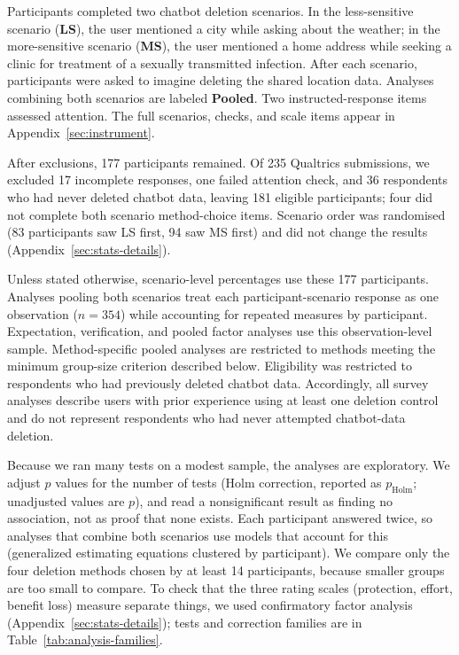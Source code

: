 \documentclass[conference,compsoc]{IEEEtran}
\begin{document}
Participants completed two chatbot deletion scenarios. In the less-sensitive scenario (\textbf{LS}), the user mentioned a city while asking about the weather; in the more-sensitive scenario (\textbf{MS}), the user mentioned a home address while seeking a clinic for treatment of a sexually transmitted infection. After each scenario, participants were asked to imagine deleting the shared location data. Analyses combining both scenarios are labeled \textbf{Pooled}. Two instructed-response items assessed attention. The full scenarios, checks, and scale items appear in Appendix~\ref{sec:instrument}.

After exclusions, 177 participants remained. Of 235 Qualtrics submissions, we excluded 17 incomplete responses, one failed attention check, and 36 respondents who had never deleted chatbot data, leaving 181 eligible participants; four did not complete both scenario method-choice items. Scenario order was randomised (83 participants saw LS first, 94 saw MS first) and did not change the results (Appendix~\ref{sec:stats-details}).

Unless stated otherwise, scenario-level percentages use these 177 participants. Analyses pooling both scenarios treat each participant-scenario response as one observation ($n=354$) while accounting for repeated measures by participant. Expectation, verification, and pooled factor analyses use this observation-level sample. Method-specific pooled analyses are restricted to methods meeting the minimum group-size criterion described below. Eligibility was restricted to respondents who had previously deleted chatbot data. Accordingly, all survey analyses describe users with prior experience using at least one deletion control and do not represent respondents who had never attempted chatbot-data deletion.

Because we ran many tests on a modest sample, the analyses are exploratory. We adjust $p$ values for the number of tests (Holm correction, reported as $p_{\mathrm{Holm}}$; unadjusted values are $p$), and read a nonsignificant result as finding no association, not as proof that none exists. Each participant answered twice, so analyses that combine both scenarios use models that account for this (generalized estimating equations clustered by participant). We compare only the four deletion methods chosen by at least 14 participants, because smaller groups are too small to compare. To check that the three rating scales (protection, effort, benefit loss) measure separate things, we used confirmatory factor analysis (Appendix~\ref{sec:stats-details}); tests and correction families are in Table~\ref{tab:analysis-families}.
\end{document}
